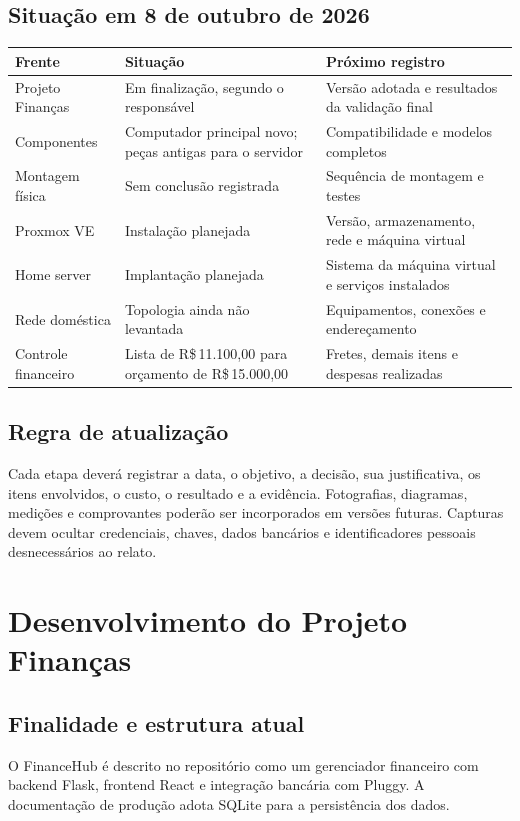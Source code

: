 \documentclass[11pt,a4paper,oneside]{report}
\newcommand{\dinheiro}[1]{R\$\,#1}
\newcommand{\datarelatorio}{8 de outubro de 2026}
\begin{document}
\section{Situação em \datarelatorio}
\begin{tabularx}{\textwidth}{@{}p{4.1cm}YY@{}}
\toprule
Frente & Situação & Próximo registro \\
\midrule
Projeto Finanças & Em finalização, segundo o responsável & Versão adotada e resultados da validação final \\
Componentes & Computador principal novo; peças antigas para o servidor & Compatibilidade e modelos completos \\
Montagem física & Sem conclusão registrada & Sequência de montagem e testes \\
Proxmox VE & Instalação planejada & Versão, armazenamento, rede e máquina virtual \\
Home server & Implantação planejada & Sistema da máquina virtual e serviços instalados \\
Rede doméstica & Topologia ainda não levantada & Equipamentos, conexões e endereçamento \\
Controle financeiro & Lista de \dinheiro{11.100,00} para orçamento de \dinheiro{15.000,00} & Fretes, demais itens e despesas realizadas \\
\bottomrule
\end{tabularx}

\section{Regra de atualização}
Cada etapa deverá registrar a data, o objetivo, a decisão, sua justificativa,
os itens envolvidos, o custo, o resultado e a evidência. Fotografias, diagramas,
medições e comprovantes poderão ser incorporados em versões futuras.
Capturas devem ocultar credenciais, chaves, dados bancários e identificadores
pessoais desnecessários ao relato.

\chapter{Desenvolvimento do Projeto Finanças}
\section{Finalidade e estrutura atual}
O FinanceHub é descrito no repositório como um gerenciador financeiro com
backend Flask, frontend React e integração bancária com Pluggy. A documentação
de produção adota SQLite para a persistência dos dados.
\end{document}
